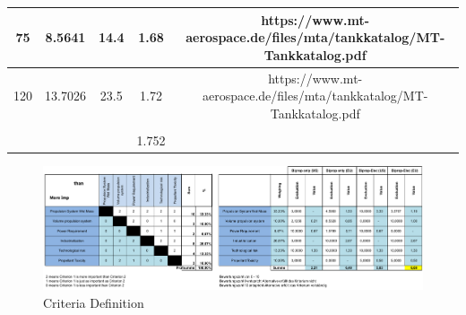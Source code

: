\begin{table}[]
{\begin{tabular}{|ccccc|}
\multicolumn{1}{|c|}{75}                      & \multicolumn{1}{c|}{8.5641}                       & \multicolumn{1}{c|}{14.4}                        & \multicolumn{1}{c|}{1.68}                         & https://www.mt-aerospace.de/files/mta/tankkatalog/MT-Tankkatalog.pdf                                             \\ \hline
\multicolumn{1}{|c|}{120}                     & \multicolumn{1}{c|}{13.7026}                      & \multicolumn{1}{c|}{23.5}                        & \multicolumn{1}{c|}{1.72}                         & https://www.mt-aerospace.de/files/mta/tankkatalog/MT-Tankkatalog.pdf                                             \\ \hline
\multicolumn{1}{|c|}{}                        & \multicolumn{1}{c|}{}                             & \multicolumn{1}{c|}{}                            & \multicolumn{1}{c|}{}                             &                                                                                                                  \\ \hline
\multicolumn{1}{|c|}{}                        & \multicolumn{1}{c|}{}                             & \multicolumn{1}{c|}{}                            & \multicolumn{1}{c|}{{\color[HTML]{34A853} 1.752}} &                                                                                                                  \\ \hline
\end{tabular}}
\end{table}

\begin{figure}
    \centering
    \includegraphics[width=\textwidth]{pdf/PaarwiseAnalysis.pdf} 
    \caption{Criteria Definition}
    \label{fig:par-an}
\end{figure}


